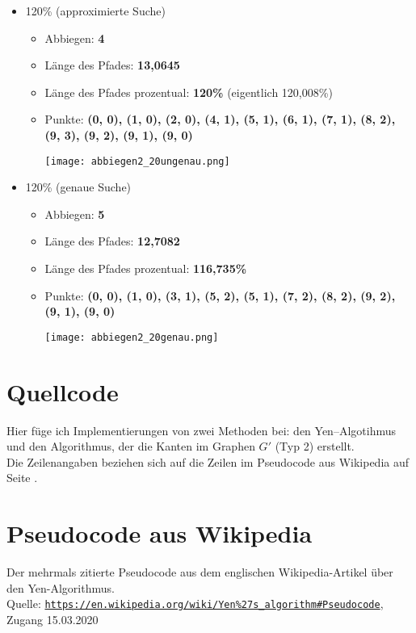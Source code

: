 \documentclass[a4paper,10pt,ngerman]{scrartcl}
\begin{document}
\begin{itemize}
  \item 120\% (approximierte Suche)   
    \begin{itemize}
      \item Abbiegen: \textbf{4}
      \item Länge des Pfades: \textbf{13,0645}
      \item Länge des Pfades prozentual: \textbf{120\%} (eigentlich 120,008\%)
      \item Punkte: \textbf{(0, 0), (1, 0), (2, 0), (4, 1), (5, 1), (6, 1), (7, 1), (8, 2), (9, 3), (9, 2), (9, 1), (9, 0)}
  \begin{center}
  \texttt{[image: abbiegen2\_20ungenau.png]}
  \end{center}
  \end{itemize}
  \item 120\% (genaue Suche)    
    \begin{itemize}
      \item Abbiegen: \textbf{5}
      \item Länge des Pfades: \textbf{12,7082}
      \item Länge des Pfades prozentual: \textbf{116,735\%}
      \item Punkte: \textbf{(0, 0), (1, 0), (3, 1), (5, 2), (5, 1), (7, 2), (8, 2), (9, 2), (9, 1), (9, 0)}
  \begin{center}
  \texttt{[image: abbiegen2\_20genau.png]}
  \end{center}
  \end{itemize}
\end{itemize}

\newpage
\section{Quellcode}
Hier füge ich Implementierungen von zwei Methoden bei:
den Yen–Algotihmus und den Algorithmus, der die Kanten im Graphen $G'$ (Typ 2) erstellt.\\
Die Zeilenangaben beziehen sich auf die Zeilen im Pseudocode aus Wikipedia auf Seite \pageref{wikipedia.pseudo}.


\newpage
\section{Pseudocode aus Wikipedia}

Der mehrmals zitierte Pseudocode aus dem englischen Wikipedia-Artikel über den Yen-Algorithmus.\\
Quelle: \href{https://en.wikipedia.org/wiki/Yen%27s_algorithm#Pseudocode}
{\texttt{https://en.wikipedia.org/wiki/Yen\%27s\_algorithm\#Pseudocode}}, Zugang 15.03.2020\\
\end{document}
